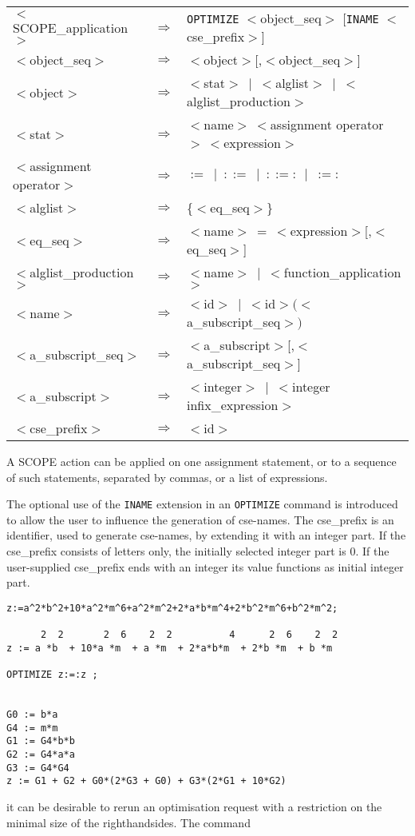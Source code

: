 {\small
\begin{flushleft}
\begin{tabular}{lcl}
$<$SCOPE\_application$>$ & $\Rightarrow$ & {\tt OPTIMIZE} $<$object\_seq$>$
[{\tt INAME} $<$cse\_prefix$>$]\\
$<$object\_seq$>$ & $\Rightarrow$ & $<$object$>$[,$<$object\_seq$>$]\\
$<$object$>$ & $\Rightarrow$ & $<$stat$>~\mid~<$alglist$>~\mid~<$alglist\_production$>$ \\
$<$stat$>$ & $\Rightarrow$ & $<$name$>~<$assignment operator$>~<$expression$>$\\
$<$assignment operator$>$ & $\Rightarrow$ & $:=~\mid~::=~\mid~::=:~\mid~:=:$\\
$<$alglist$>$ & $\Rightarrow$ & \{$<$eq\_seq$>$\}\\
$<$eq\_seq$>$ & $\Rightarrow$ & $<$name$>~=~<$expression$>$[,$<$eq\_seq$>$]\\
$<$alglist\_production$>$ & $\Rightarrow$ & $<$name$>~\mid~<$function\_application$>$\\
$<$name$>$ & $\Rightarrow$ & $<$id$>~\mid~<$id$>(<$a\_subscript\_seq$>)$\\
$<$a\_subscript\_seq$>$ & $\Rightarrow$ & $<$a\_subscript$>$[,$<$a\_subscript\_seq$>$]\\
$<$a\_subscript$>$ & $\Rightarrow$ & $<$integer$>~\mid~<$integer infix\_expression$>$\\
$<$cse\_prefix$>$ & $\Rightarrow$ & $<$id$>$
\end{tabular}
\end{flushleft}}

A SCOPE action can be applied on one assignment statement, or to a
sequence of such statements, separated by commas, or a list of expressions.

The optional use of the {\tt INAME} extension in an {\tt OPTIMIZE}
command is introduced to allow the user to influence the generation of
cse-names.  The cse\_prefix is an identifier, used to generate
cse-names, by extending it with an integer part. If the cse\_prefix
consists of letters only, the initially selected integer part is 0.
If the user-supplied cse\_prefix ends with an integer its value
functions as initial integer part.

\begin{verbatim}
z:=a^2*b^2+10*a^2*m^6+a^2*m^2+2*a*b*m^4+2*b^2*m^6+b^2*m^2;

      2  2       2  6    2  2          4      2  6    2  2
z := a *b  + 10*a *m  + a *m  + 2*a*b*m  + 2*b *m  + b *m

OPTIMIZE z:=:z ;


G0 := b*a
G4 := m*m
G1 := G4*b*b
G2 := G4*a*a
G3 := G4*G4
z := G1 + G2 + G0*(2*G3 + G0) + G3*(2*G1 + 10*G2)

\end{verbatim}
it can be desirable
to rerun an optimisation request with a restriction on the minimal size of
the righthandsides. The command

